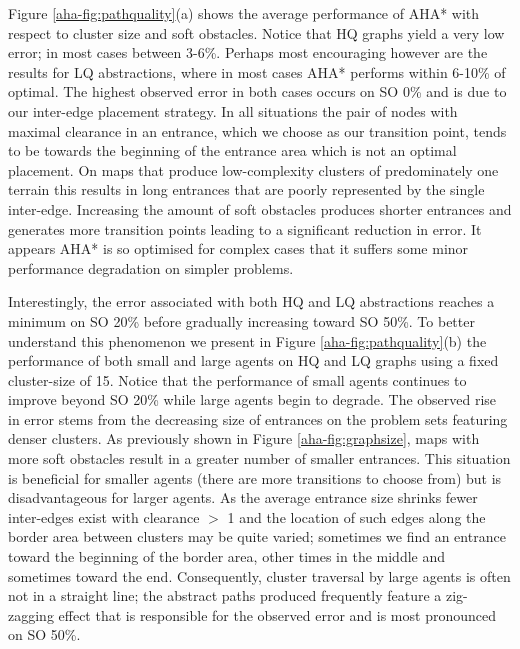 \par \indent
Figure \ref{aha-fig:pathquality}(a) shows the average performance of AHA* with respect to cluster size and soft obstacles.  
Notice that HQ graphs yield a very low error; in most cases between 3-6\%. 
Perhaps most encouraging however are the results for LQ abstractions, where in most cases AHA* performs within 6-10\% of optimal. 
The highest observed error in both cases occurs on SO 0\% and is due to our inter-edge placement strategy.
In all situations the pair of nodes with maximal clearance in an entrance, which we choose as our transition point, tends to be towards the beginning of the entrance area which is not an optimal placement.
On maps that produce low-complexity clusters of predominately one terrain this results in long entrances that are poorly represented by the single inter-edge.
Increasing the amount of soft obstacles produces shorter entrances and generates more transition points leading to a significant reduction in error. 
It appears AHA* is so optimised for complex cases that it suffers some minor performance degradation on simpler problems. 
\par \indent
Interestingly, the error associated with both HQ and LQ abstractions reaches a minimum on SO 20\% before gradually increasing toward SO 50\%. 
To better understand this phenomenon we present in Figure \ref{aha-fig:pathquality}(b) the performance of both small and large agents on HQ and LQ graphs using a fixed cluster-size of 15.
Notice that the performance of small agents continues to improve beyond SO 20\% while large agents begin to degrade.
The observed rise in error stems from the decreasing size of entrances on the problem sets featuring denser clusters. 
As previously shown in Figure \ref{aha-fig:graphsize}, maps with more soft obstacles result in a greater number of smaller entrances. 
This situation is beneficial for smaller agents (there are more transitions to choose from) but is disadvantageous for larger agents.
As the average entrance size shrinks fewer inter-edges exist with clearance $>$ 1 and the location of such edges along the border area between clusters may be quite varied; sometimes we find an entrance toward the beginning of the border area, other times in the middle and sometimes toward the end.
Consequently, cluster traversal by large agents is often not in a straight line; the abstract paths produced frequently feature a zig-zagging effect that is responsible for the observed error and is most pronounced on SO 50\%.
